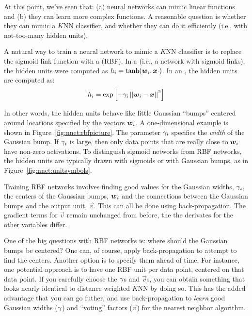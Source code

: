 At this point, we've seen that: (a) neural networks can mimic linear
functions and (b) they can learn more complex functions.  A reasonable
question is whether they can mimic a $K$NN classifier, and whether
they can do it efficiently (i.e., with not-too-many hidden units).

A natural way to train a neural network to mimic a $K$NN classifier is
to replace the sigmoid link function with a  (RBF).  In a  (i.e., a network
with sigmoid links), the hidden units were computed as $h_i =
\tanh({\boldsymbol{w}}_i,{\boldsymbol{x}} \cdot )$.  In an , the hidden
units are computed as:
%
\begin{equation}
h_i = \exp\left[ - \gamma_i \left\vert\left\vert {\boldsymbol{w}}_i - {\boldsymbol{x}} \right\vert\right\vert^2 \right]
\end{equation}
%

%
In other words, the hidden units behave like little Gaussian ``bumps''
centered around locations specified by the vectors ${\boldsymbol{w}}_i$.  A
one-dimensional example is shown in Figure~\ref{fig:nnet:rbfpicture}.
The parameter $\gamma_i$ specifies the \emph{width} of the Gaussian bump.
If $\gamma_i$ is large, then only data points that are really close to
${\boldsymbol{w}}_i$ have non-zero activations.  To distinguish sigmoid networks
from RBF networks, the hidden units are typically drawn with sigmoids
or with Gaussian bumps, as in Figure~\ref{fig:nnet:unitsymbols}.

Training RBF networks involves finding good values for the Gaussian
widths, $\gamma_i$, the centers of the Gaussian bumps, ${\boldsymbol{w}}_i$ and the
connections between the Gaussian bumps and the output unit, $\vec v$.
This can all be done using back-propagation.  The gradient terms for
$\vec v$ remain unchanged from before, the the derivates for the other
variables differ.

One of the big questions with RBF networks is: where should the
Gaussian bumps be centered?  One can, of course, apply
back-propagation to attempt to find the centers.  Another option is to
specify them ahead of time.  For instance, one potential approach is
to have one RBF unit per data point, centered on that data point.  If
you carefully choose the $\gamma$s and $\vec v$s, you can obtain
something that looks nearly identical to distance-weighted $K$NN by
doing so.  This has the added advantage that you can go futher, and
use back-propagation to \emph{learn} good Gaussian widths ($\gamma$) and
``voting'' factors ($\vec v$) for the nearest neighbor algorithm.

